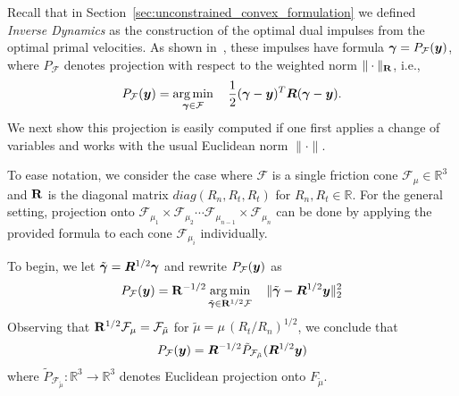 Recall that in Section~\ref{sec:unconstrained_convex_formulation}
we defined \emph{Inverse Dynamics}
as the construction of the optimal dual impulses
from the optimal primal velocities.  As shown in~\cite{bib:todorov2014},
these impulses have formula ${\bm\gamma} = P_{\mathcal{F}}({\bm{y}})$, 
where $P_{\mathcal{F}}$ denotes projection
with respect to the weighted norm $\|\cdot\|_{{\mathbf{R}}}$, i.e.,
\[
P_{\mathcal{F}}({\bm{y}}) = \operatorname*{arg\,min}_{{\bm\gamma}\in\mathcal{F}} \quad \frac{1}{2}({\bm\gamma}-{\bm{y}})^T{\bm{R}}({\bm\gamma}-{\bm{y}}).
\]
We next show this projection is easily computed
if one first applies a change of variables and works with the usual Euclidean norm $\|\cdot\|$.


To ease notation, we consider the case where $\mathcal{F}$
is a single friction cone $\mathcal{F}_{\mu} \in \mathbb{R}^3$
and ${\mathbf{R}}$ is the diagonal matrix $diag(R_n, R_t, R_t)$
for $R_n, R_t \in \mathbb{R}$.  For the general setting, projection
onto $\mathcal{F}_{\mu_1} \times \mathcal{F}_{\mu_2} \cdots \mathcal{F}_{\mu_{n-1}}\times\mathcal{F}_{\mu_n}$
can be done  by applying the provided formula to
each cone $\mathcal{F}_{\mu_i}$ individually.

To begin, we let $\tilde{{\bm\gamma}}={\bm{R}}^{1/2}{\bm\gamma}$ 
and rewrite $P_{\mathcal{F}}({\bm{y}})$ as
\[
  P_{\mathcal{F}}({\bm{y}}) = {\mathbf{R}}^{-1/2} \operatorname*{arg\,min}_{\tilde {{\bm\gamma}}\in {\mathbf{R}}^{1/2} \mathcal{F}} \quad \Vert\tilde{{\bm\gamma}}-  {\bm{R}}^{1/2}{\bm{y}} \Vert_2^2
\]                                                                               
Observing that ${\mathbf{R}}^{1/2} \mathcal{F}_{\mu} = \mathcal{F}_{\tilde\mu}$ for $\tilde \mu =\mu\,(R_t/R_n)^{1/2}$,
we conclude that
\begin{eqnarray}
  P_\mathcal{F}(\vf{y})=\vf{R}^{-1/2} \tilde{P}_\mathcal{F_{\tilde\mu}}(\vf{R}^{1/2}\vf{y})
	\label{eq:local_optimization_problem_tilde}
\end{eqnarray}
where $\tilde{P}_\mathcal{F_{\tilde\mu}} : \mathbb{R}^3 \rightarrow \mathbb{R}^3$ denotes Euclidean projection onto $F_{\tilde\mu}$.

